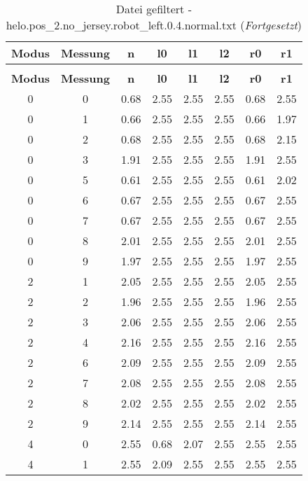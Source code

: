 \begin{longtable}{|c|c||c||c|c|c||c|c|}
	\caption{Datei gefiltert - helo.pos\_2.no\_jersey.robot\_left.0.4.normal.txt} \label{tab:helo.pos-2.no-jersey.robot-left.0.4.normal.txt} \\ \hline
	\textbf{Modus} & \textbf{Messung} & \textbf{n} & \textbf{l0} & \textbf{l1} & \textbf{l2} & \textbf{r0} & \textbf{r1}\\ \hline
	\endfirsthead
	\caption[]{Datei gefiltert - helo.pos\_2.no\_jersey.robot\_left.0.4.normal.txt (\emph{Fortgesetzt})} \\ \hline
	\textbf{Modus} & \textbf{Messung} & \textbf{n} & \textbf{l0} & \textbf{l1} & \textbf{l2} & \textbf{r0} & \textbf{r1}\\ \hline
	\endhead
	0 & 0 & 0.68 & 2.55 & 2.55 & 2.55 & 0.68 & 2.55 \\ \hline
	0 & 1 & 0.66 & 2.55 & 2.55 & 2.55 & 0.66 & 1.97 \\ \hline
	0 & 2 & 0.68 & 2.55 & 2.55 & 2.55 & 0.68 & 2.15 \\ \hline
	0 & 3 & 1.91 & 2.55 & 2.55 & 2.55 & 1.91 & 2.55 \\ \hline
	0 & 5 & 0.61 & 2.55 & 2.55 & 2.55 & 0.61 & 2.02 \\ \hline
	0 & 6 & 0.67 & 2.55 & 2.55 & 2.55 & 0.67 & 2.55 \\ \hline
	0 & 7 & 0.67 & 2.55 & 2.55 & 2.55 & 0.67 & 2.55 \\ \hline
	0 & 8 & 2.01 & 2.55 & 2.55 & 2.55 & 2.01 & 2.55 \\ \hline
	0 & 9 & 1.97 & 2.55 & 2.55 & 2.55 & 1.97 & 2.55 \\ \hline
	2 & 1 & 2.05 & 2.55 & 2.55 & 2.55 & 2.05 & 2.55 \\ \hline
	2 & 2 & 1.96 & 2.55 & 2.55 & 2.55 & 1.96 & 2.55 \\ \hline
	2 & 3 & 2.06 & 2.55 & 2.55 & 2.55 & 2.06 & 2.55 \\ \hline
	2 & 4 & 2.16 & 2.55 & 2.55 & 2.55 & 2.16 & 2.55 \\ \hline
	2 & 6 & 2.09 & 2.55 & 2.55 & 2.55 & 2.09 & 2.55 \\ \hline
	2 & 7 & 2.08 & 2.55 & 2.55 & 2.55 & 2.08 & 2.55 \\ \hline
	2 & 8 & 2.02 & 2.55 & 2.55 & 2.55 & 2.02 & 2.55 \\ \hline
	2 & 9 & 2.14 & 2.55 & 2.55 & 2.55 & 2.14 & 2.55 \\ \hline
	4 & 0 & 2.55 & 0.68 & 2.07 & 2.55 & 2.55 & 2.55 \\ \hline
	4 & 1 & 2.55 & 2.09 & 2.55 & 2.55 & 2.55 & 2.55 \\ \hline

\end{longtable}

